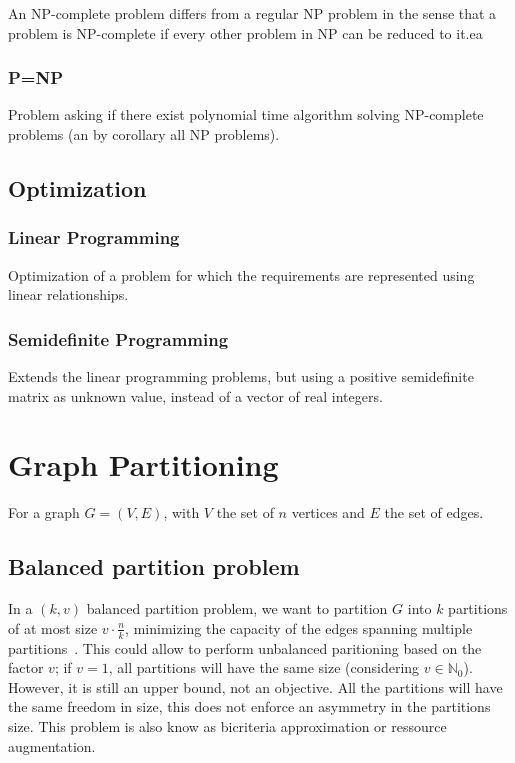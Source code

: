 \documentclass[12pt,a4paper]{article}
\begin{document}
An NP-complete problem differs from a regular NP problem in the sense that a problem is NP-complete if every other problem in NP can be reduced to it.ea

\subsubsection{P=NP}
Problem asking if there exist polynomial time algorithm solving NP-complete problems (an by corollary all NP problems).

\subsection{Optimization}

\subsubsection{Linear Programming}
Optimization of a problem for which the requirements are represented using linear relationships.

\subsubsection{Semidefinite Programming}
Extends the linear programming problems, but using a positive semidefinite matrix as unknown value, instead of a vector of real integers.

\section{Graph Partitioning}
For a graph $G = (V, E)$, with $V$ the set of $n$ vertices and $E$ the set of edges.

\subsection{Balanced partition problem}
In a $(k, v)$ balanced partition problem, we want to partition $G$ into $k$ partitions of at most size $v\cdot\frac{n}{k}$, minimizing the capacity of the edges spanning multiple partitions~\cite{Andreev:2004:BGP:1007912.1007931}.
This could allow to perform unbalanced paritioning based on the factor $v$; if $v = 1$, all partitions will have the same size (considering $v \in \mathbb{N}_0$).
However, it is still an upper bound, not an objective.
All the partitions will have the same freedom in size, this does not enforce an asymmetry in the partitions size.
This problem is also know as bicriteria approximation or ressource augmentation.
\end{document}
